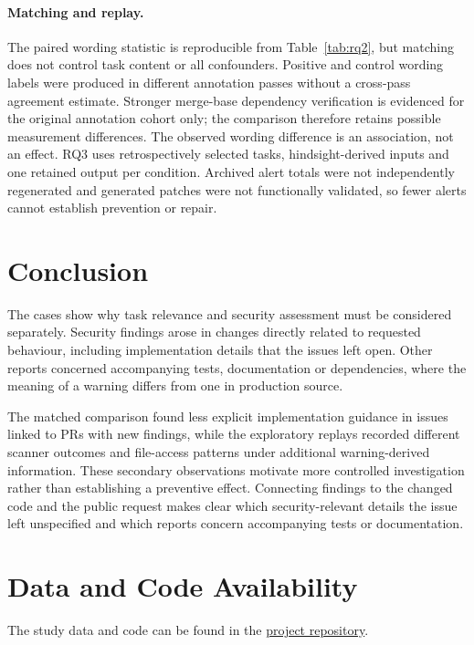 \documentclass[acmsmall,screen,nonacm]{acmart}
\begin{document}
\paragraph{Matching and replay.} The paired wording statistic is reproducible from Table~\ref{tab:rq2}, but matching does not control task content or all confounders. Positive and control wording labels were produced in different annotation passes without a cross-pass agreement estimate. Stronger merge-base dependency verification is evidenced for the original annotation cohort only; the comparison therefore retains possible measurement differences. The observed wording difference is an association, not an effect. RQ3 uses retrospectively selected tasks, hindsight-derived inputs and one retained output per condition. Archived alert totals were not independently regenerated and generated patches were not functionally validated, so fewer alerts cannot establish prevention or repair.

\section{Conclusion}

The cases show why task relevance and security assessment must be considered separately. Security findings arose in changes directly related to requested behaviour, including implementation details that the issues left open. Other reports concerned accompanying tests, documentation or dependencies, where the meaning of a warning differs from one in production source.

The matched comparison found less explicit implementation guidance in issues linked to PRs with new findings, while the exploratory replays recorded different scanner outcomes and file-access patterns under additional warning-derived information. These secondary observations motivate more controlled investigation rather than establishing a preventive effect. Connecting findings to the changed code and the public request makes clear which security-relevant details the issue left unspecified and which reports concern accompanying tests or documentation.

\section*{Data and Code Availability}

The study data and code can be found in the \href{https://github.com/Stralb/adversarial-swe-agents}{project repository}.
\end{document}
